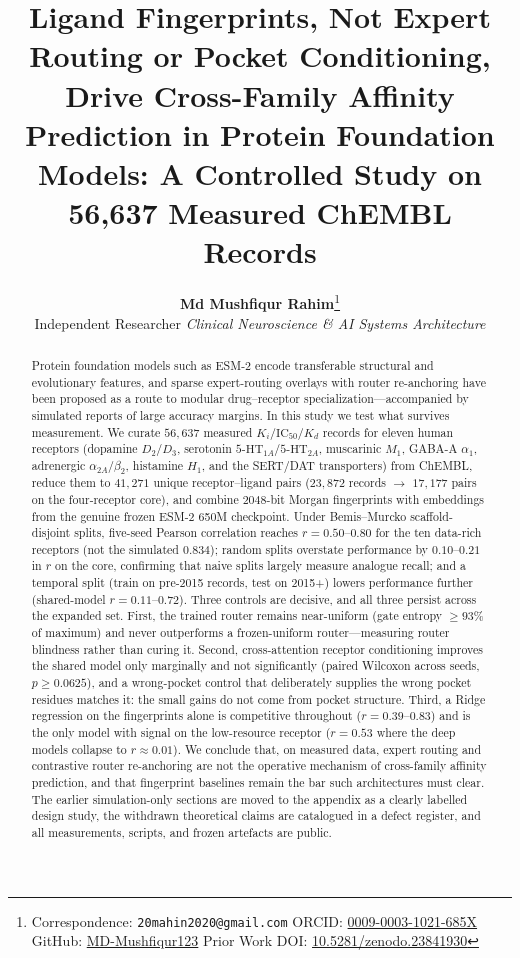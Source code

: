\documentclass{article}
\title{\textbf{Ligand Fingerprints, Not Expert Routing or Pocket Conditioning, Drive Cross-Family Affinity Prediction in Protein Foundation Models: A Controlled Study on 56,637 Measured ChEMBL Records}}
\author{
  \textbf{Md Mushfiqur Rahim}\thanks{Correspondence: \texttt{20mahin2020@gmail.com} \quad ORCID: \href{https://orcid.org/0009-0003-1021-685X}{0009-0003-1021-685X} \quad GitHub: \href{https://github.com/MD-Mushfiqur123}{MD-Mushfiqur123} \quad Prior Work DOI: \href{https://doi.org/10.5281/zenodo.23841930}{10.5281/zenodo.23841930}} \\
  Independent Researcher \quad \textit{Clinical Neuroscience \& AI Systems Architecture}
}
\theoremstyle{definition}
\begin{document}
\maketitle

\begin{abstract}
Protein foundation models such as ESM-2 encode transferable structural and evolutionary features, and sparse expert-routing overlays with router re-anchoring have been proposed as a route to modular drug--receptor specialization---accompanied by simulated reports of large accuracy margins. In this study we test what survives measurement. We curate $56{,}637$ measured $K_i/\mathrm{IC}_{50}/K_d$ records for eleven human receptors (dopamine $D_2$/$D_3$, serotonin $5\text{-HT}_{1A}$/$5\text{-HT}_{2A}$, muscarinic $M_1$, GABA-A $\alpha_1$, adrenergic $\alpha_{2A}$/$\beta_2$, histamine $H_1$, and the SERT/DAT transporters) from ChEMBL, reduce them to $41{,}271$ unique receptor--ligand pairs ($23{,}872$ records $\to$ $17{,}177$ pairs on the four-receptor core), and combine $2048$-bit Morgan fingerprints with embeddings from the genuine frozen ESM-2 650M checkpoint. Under Bemis--Murcko scaffold-disjoint splits, five-seed Pearson correlation reaches $r = 0.50$--$0.80$ for the ten data-rich receptors (not the simulated $0.834$); random splits overstate performance by $0.10$--$0.21$ in $r$ on the core, confirming that naive splits largely measure analogue recall; and a temporal split (train on pre-2015 records, test on 2015+) lowers performance further (shared-model $r = 0.11$--$0.72$). Three controls are decisive, and all three persist across the expanded set. First, the trained router remains near-uniform (gate entropy $\ge 93\%$ of maximum) and never outperforms a frozen-uniform router---measuring router blindness rather than curing it. Second, cross-attention receptor conditioning improves the shared model only marginally and not significantly (paired Wilcoxon across seeds, $p \ge 0.0625$), and a wrong-pocket control that deliberately supplies the wrong pocket residues matches it: the small gains do not come from pocket structure. Third, a Ridge regression on the fingerprints alone is competitive throughout ($r = 0.39$--$0.83$) and is the only model with signal on the low-resource receptor ($r = 0.53$ where the deep models collapse to $r \approx 0.01$). We conclude that, on measured data, expert routing and contrastive router re-anchoring are not the operative mechanism of cross-family affinity prediction, and that fingerprint baselines remain the bar such architectures must clear. The earlier simulation-only sections are moved to the appendix as a clearly labelled design study, the withdrawn theoretical claims are catalogued in a defect register, and all measurements, scripts, and frozen artefacts are public.
\end{abstract}
\end{document}
